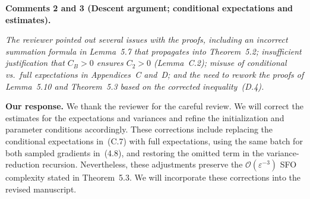 \documentclass[11pt]{article}
\newcommand{\blue}[1]{\textcolor{blue}{#1}}
\begin{document}
\vspace{0.5em}
\noindent\textbullet\quad\textbf{Comments 2 and 3
(Descent argument; conditional expectations and estimates).}

\noindent\emph{%
The reviewer pointed out several issues with the proofs, including
an incorrect summation formula in Lemma~5.7 that
propagates into Theorem~5.2; insufficient justification
that $C_B>0$ ensures $C_2>0$ (Lemma~C.2);
misuse of conditional vs.\ full expectations in
Appendices~C and~D; and the need to rework the proofs
of Lemma~5.10 and Theorem~5.3 based on the corrected
inequality~(D.4).}

\vspace{0.5em}
\noindent\textbullet\quad\textbf{Our response.}
We thank the reviewer for the careful review. We will correct
the estimates for the expectations and variances and refine the
initialization and parameter conditions accordingly.
These corrections include replacing the conditional expectations
in~(C.7) with full expectations, using the same batch for both
sampled gradients in~(4.8), and restoring the omitted term in
the variance-reduction recursion.
Nevertheless, these adjustments preserve the
$\mathcal{O}(\varepsilon^{-3})$ SFO complexity stated in
Theorem~5.3. We will incorporate these corrections into the revised manuscript.



\end{document}
